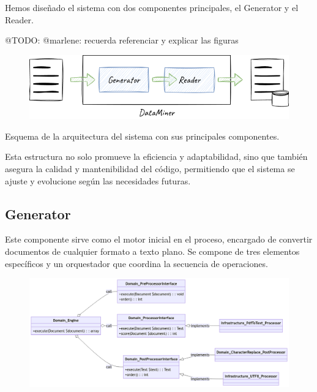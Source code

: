 Hemos diseñado el sistema con dos componentes principales, el Generator y el Reader.

\colorbox{color_highlight}{@TODO: @marlene:} recuerda referenciar y explicar las figuras

\begin{figure}
    \centering
    \includegraphics{./chapter/4/images/ad_4nxfvsrqaa0z4oog6ioupbhm9di1ks0uugteour8yll1z9polcxzput4la1osaqqlp61xyowlcejwkesovongxvd1rop2gxft}
    \caption{}
    \label{fig:ad_4nxfvsrqaa0z4oog6ioupbhm9di1ks0uugteour8yll1z9polcxzput4la1osaqqlp61xyowlcejwkesovongxvd1rop2gxft}
\end{figure}

Esquema de la arquitectura del sistema con sus principales componentes.

Esta estructura no solo promueve la eficiencia y adaptabilidad, sino que también asegura la calidad y mantenibilidad del código, permitiendo que el sistema se ajuste y evolucione según las necesidades futuras.

\subsection{Generator}
Este componente sirve como el motor inicial en el proceso, encargado de convertir documentos de cualquier formato a texto plano. Se compone de tres elementos específicos y un orquestador que coordina la secuencia de operaciones.

\begin{figure}
    \centering
    \includegraphics{./chapter/4/images/ad_4nxcpbcugaqoykyq7hbpnr9p7_uswyuzipkcqvfkgc1fhoclp9cwrzu6zkoszpxi3zqsthvvftxotwhksqawgubuwqffg5gxn}
    \caption{}
    \label{fig:ad_4nxcpbcugaqoykyq7hbpnr9p7_uswyuzipkcqvfkgc1fhoclp9cwrzu6zkoszpxi3zqsthvvftxotwhksqawgubuwqffg5gxn}
\end{figure}


